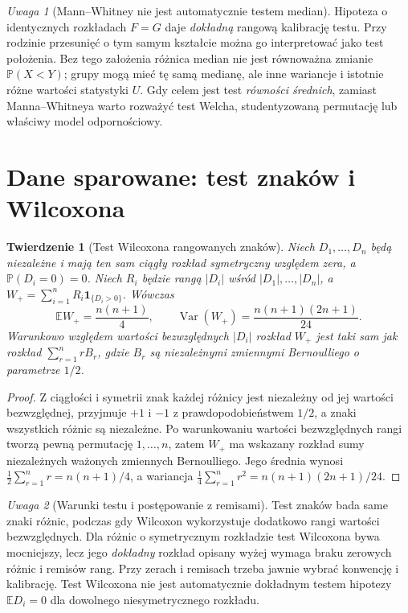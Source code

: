 \documentclass[11pt,a4paper,oneside]{report}
\numberwithin{equation}{chapter}
\theoremstyle{plain}
\newtheorem{twierdzenie}{Twierdzenie}[chapter]
\theoremstyle{definition}
\theoremstyle{remark}
\newtheorem{uwaga}{Uwaga}[chapter]
\newcommand{\Prob}{\mathbb P}
\newcommand{\E}{\mathbb E}
\newcommand{\Var}{\operatorname{Var}}
\newcommand{\ind}[1]{\mathbf 1_{#1}}
\begin{document}
\begin{uwaga}[Mann--Whitney nie jest automatycznie testem median]
Hipoteza o identycznych rozkładach $F=G$ daje
\emph{dokładną} rangową kalibrację testu.
Przy rodzinie przesunięć o tym samym kształcie można
go interpretować jako test położenia.
Bez tego założenia różnica median nie jest równoważna
zmianie $\Prob(X<Y)$; grupy mogą mieć tę samą medianę,
ale inne wariancje i istotnie różne wartości statystyki $U$.
Gdy celem jest test \emph{równości średnich}, zamiast
Manna--Whitneya warto rozważyć test Welcha,
studentyzowaną permutację lub właściwy model odpornościowy.
\end{uwaga}

\section{Dane sparowane: test znaków i Wilcoxona}
\begin{twierdzenie}[Test Wilcoxona rangowanych znaków]
\label{thm:wilcoxon-signed-rank}
Niech $D_1,\ldots,D_n$ będą niezależne i mają ten sam
ciągły rozkład symetryczny względem zera, a
$\Prob(D_i=0)=0$. Niech $R_i$ będzie rangą
$|D_i|$ wśród $|D_1|,\ldots,|D_n|$, a
$W_+=\sum_{i=1}^nR_i\ind{\{D_i>0\}}$.
Wówczas
\[
 \E W_+=\frac{n(n+1)}4,\qquad
 \Var(W_+)=\frac{n(n+1)(2n+1)}{24}.
\]
Warunkowo względem wartości bezwzględnych $|D_i|$
rozkład $W_+$ jest taki sam jak rozkład
$\sum_{r=1}^nrB_r$, gdzie $B_r$ są niezależnymi
zmiennymi Bernoulliego o parametrze $1/2$.
\end{twierdzenie}
\begin{proof}
Z ciągłości i symetrii znak każdej różnicy jest
niezależny od jej wartości bezwzględnej, przyjmuje
$+1$ i $-1$ z prawdopodobieństwem $1/2$,
a znaki wszystkich różnic są niezależne.
Po warunkowaniu wartości bezwzględnych rangi tworzą pewną permutację
$1,\ldots,n$, zatem $W_+$ ma wskazany rozkład sumy
niezależnych ważonych zmiennych Bernoulliego.
Jego średnia wynosi $\tfrac12\sum_{r=1}^nr=n(n+1)/4$,
a wariancja $\tfrac14\sum_{r=1}^nr^2
=n(n+1)(2n+1)/24$.
\end{proof}

\begin{uwaga}[Warunki testu i postępowanie z remisami]
Test znaków bada same znaki różnic, podczas gdy
Wilcoxon wykorzystuje dodatkowo rangi wartości
bezwzględnych. Dla różnic o symetrycznym rozkładzie
test Wilcoxona bywa mocniejszy, lecz jego
\emph{dokładny} rozkład opisany wyżej wymaga
braku zerowych różnic i remisów rang.
Przy zerach i remisach trzeba jawnie wybrać
konwencję i kalibrację. Test Wilcoxona nie jest
automatycznie dokładnym testem hipotezy
$\E D_i=0$ dla dowolnego niesymetrycznego rozkładu.
\end{uwaga}
\end{document}
